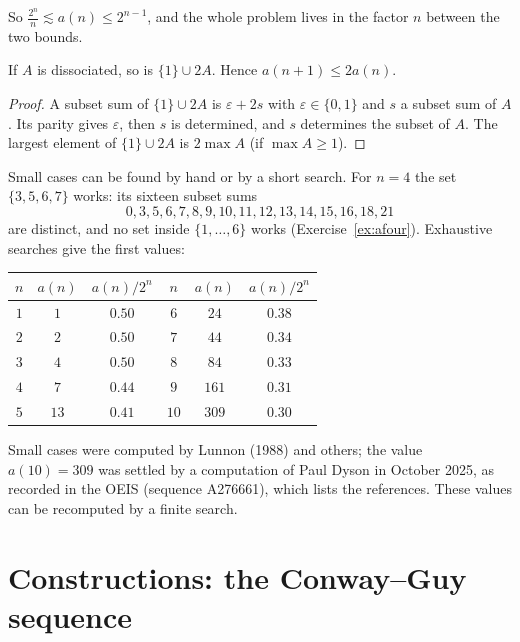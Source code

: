 So $\frac{2^n}n\lesssim a(n)\le2^{n-1}$, and the whole problem lives in the factor $n$ between the two bounds.

\begin{proposition}[doubling]\label{prop:doubling}
If $A$ is dissociated, so is $\{1\}\cup2A$. Hence $a(n+1)\le2a(n)$.
\end{proposition}

\begin{proof}
A subset sum of $\{1\}\cup2A$ is $\varepsilon+2s$ with $\varepsilon\in\{0,1\}$ and $s$ a subset sum of $A$. Its parity gives $\varepsilon$, then $s$ is determined, and $s$
determines the subset of $A$. The largest element of $\{1\}\cup2A$ is $2\max A$ (if $\max A\ge1$).
\end{proof}

Small cases can be found by hand or by a short search. For $n=4$ the set $\{3,5,6,7\}$ works: its sixteen subset sums
\[
0,3,5,6,7,8,9,10,11,12,13,14,15,16,18,21
\]
are distinct, and no set inside $\{1,\dots,6\}$ works (Exercise~\ref{ex:afour}). Exhaustive searches give the first values:
\begin{center}
\begin{tabular}{c|c|c||c|c|c}
$n$&$a(n)$&$a(n)/2^n$&$n$&$a(n)$&$a(n)/2^n$\\\hline
$1$&$1$&$0.50$&$6$&$24$&$0.38$\\
$2$&$2$&$0.50$&$7$&$44$&$0.34$\\
$3$&$4$&$0.50$&$8$&$84$&$0.33$\\
$4$&$7$&$0.44$&$9$&$161$&$0.31$\\
$5$&$13$&$0.41$&$10$&$309$&$0.30$\\
\end{tabular}
\end{center}
Small cases were computed by Lunnon (1988) and others; the value $a(10)=309$ was settled by a computation of Paul Dyson in October 2025,
as recorded in the OEIS (sequence A276661), which lists the references. These values can be recomputed by a finite search.

\section{Constructions: the Conway--Guy sequence}

